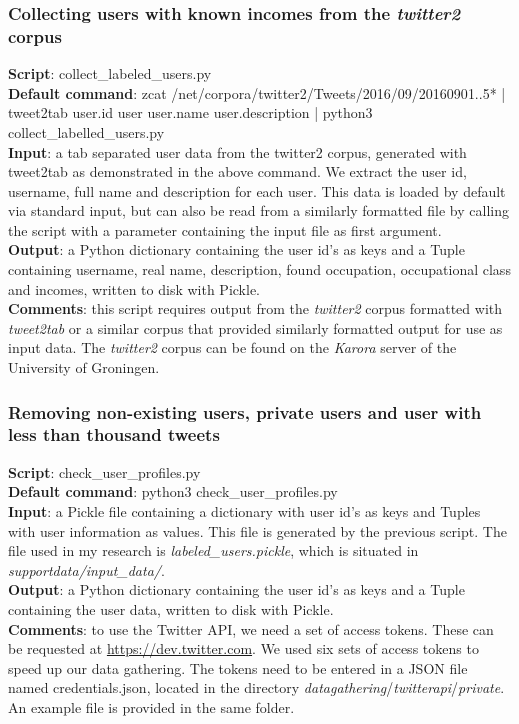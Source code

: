 \documentclass[
10pt, %
a4paper, %
oneside, %
headinclude,footinclude, %
] {book}%
\begin{document}
\subsubsection{Collecting users with known incomes from the \textit{twitter2} corpus}
\textbf{Script}:	collect\_labeled\_users.py \\
\textbf{Default command}: zcat /net/corpora/twitter2/Tweets/2016/09/2016090{1..5}* | tweet2tab user.id user user.name user.description | python3 collect\_labelled\_users.py\\
\textbf{Input}: a tab separated user data from the twitter2 corpus, generated with tweet2tab as demonstrated in the above command. We extract the user id, username, full name and description for each user. This data is loaded by default via standard input, but can also be read from a similarly formatted file by calling the script with a parameter containing the input file as first argument. \\
\textbf{Output}: a Python dictionary containing the user id's as keys and a Tuple containing username, real name,
     description, found occupation, occupational class and incomes, written to disk with Pickle.\\
\textbf{Comments}: this script requires output from the \textit{twitter2} corpus formatted with \textit{tweet2tab} or a similar corpus that provided similarly formatted output for use as input data. The \textit{twitter2} corpus can be found on the \textit{Karora} server of the University of Groningen. 

\subsubsection{Removing non-existing users, private users and user with less than thousand tweets}
\textbf{Script}:	check\_user\_profiles.py \\
\textbf{Default command}: python3 check\_user\_profiles.py \\
\textbf{Input}: a Pickle file containing a dictionary with user id's as keys and Tuples with user information as values. This file is generated by the previous script. The file used in my research is \textit{labeled\_users.pickle}, which is situated in  \textit{supportdata/input\_data/}.  \\
\textbf{Output}:  a Python dictionary containing the user id's as keys and a Tuple containing the user data, written to disk with Pickle. \\
\textbf{Comments}: to use the Twitter API, we need a set of access tokens. These can be requested at \url{https://dev.twitter.com}. We used six sets of access tokens to speed up our data gathering. The tokens need to be entered in a JSON file named credentials.json, located in the directory \textit{datagathering}/\textit{twitterapi}/\textit{private}. An example file is provided in the same folder.
\end{document}
